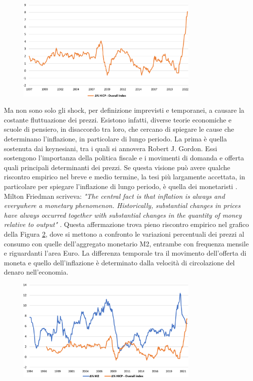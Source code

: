 \begin{figure}[h]
	\centering
	\includegraphics[width=0.80\textwidth]{img/inflation_ea_2022.pdf}
	\caption{}
	\label{img:inflation_ea_2022}
\end{figure}

Ma non sono solo gli shock, per definizione imprevisti e temporanei, a causare la costante fluttuazione dei prezzi. Esistono infatti, diverse teorie economiche e scuole di pensiero, in disaccordo tra loro, che cercano di spiegare le cause che determinano l'inflazione, in particolare di lungo periodo. La prima è quella sostenuta dai keynesiani, tra i quali si annovera Robert J. Gordon. Essi sostengono l'importanza della politica fiscale e i movimenti di domanda e offerta quali principali determinanti dei prezzi. Se questa visione può avere qualche riscontro empirico nel breve e medio termine, la tesi più largamente accettata, in particolare per spiegare l'inflazione di lungo periodo, è quella dei monetaristi \parencite{Blanchard_macroeconomia}. Milton Friedman scriveva: \textit{"The central fact is that inflation is always and everywhere a monetary phenomenon. Historically, substantial changes in prices have always occurred together with substantial changes in the quantity of money relative to output"} \parencite{Friedman_monetarism}. Questa affermazione trova pieno riscontro empirico nel grafico della Figura \ref{img:inflation_m2}, dove si mettono a confronto le variazioni percentuali dei prezzi al consumo con quelle dell'aggregato monetario M2, entrambe con frequenza mensile e riguardanti l'area Euro. La differenza temporale tra il movimento dell'offerta di moneta e quello dell'inflazione è determinato dalla velocità di circolazione del denaro nell'economia.

\begin{figure}[h]
	\centering
	\includegraphics[width=0.80\textwidth]{img/inflation_m2.pdf}
	\caption{}
	\label{img:inflation_m2}
\end{figure}


